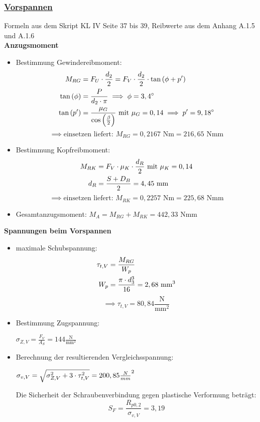 \subsubsection{\underline{Vorspannen}}
Formeln aus dem Skript KL IV  Seite 37 bis 39, Reibwerte aus dem Anhang A.1.5 und A.1.6 \\
\textbf{Anzugsmoment}\\
\begin{itemize}
	\item Bestimmung Gewindereibmoment: 
	\begin{align*}
	M_{RG} &= F_U \cdot \frac{d_2}{2} = F_V\cdot \frac{d_2}{2}\cdot \tan\left(\phi + p'\right)\\
	\tan\left(\phi\right) &= \frac{P}{d_2 \cdot \pi}\implies \phi = 3,4^{\circ}\\
	\tan\left(p'\right) &= \frac{\mu_G}{\cos\left(\frac{\beta}{2}\right)} \text{ mit } \mu_G = 0,14 \implies p' = 9,18^{\circ}
	\end{align*}
	\[\implies \text{einsetzen liefert: }  M_{RG} = 0,2167 \text{ Nm} = 216,65\text{ Nmm}\]
	
	\item Bestimmung Kopfreibmoment:
	\begin{align*}
	M_{RK}&= F_V\cdot \mu_K\cdot \frac{d_R}{2} \text{ mit }\mu_K = 0,14\\
	d_R &= \frac{S+D_B}{2} = 4,45 \text{ mm}
	\end{align*}
	\[\implies \text{einsetzen liefert: }  M_{RK} = 0,2257 \text{ Nm} = 225,68\text{ Nmm} \]
	
	\item Gesamtanzugsmoment:
	$M_A = M_{RG} + M_{RK} = 442,33 \text{ Nmm}$
\end{itemize}
\newpage
\textbf{Spannungen beim Vorspannen}
\begin{itemize}
	\item maximale Schubspannung:
	\begin{align*}
	\tau_{t,V} &= \frac{M_{RG}}{W_p}\\
	W_p &= \frac{\pi\cdot d_3^3}{16} = 2,68 \text{ mm}^3
	\end{align*}
	\[\implies \tau_{t,V} = 80,84 \frac{\text{N}}{\text{mm}^2}\]
	\item Bestimmung Zugspannung: \\
	\begin{center} $\sigma_{Z,V} = \frac{F_V}{A_S} = 144 \frac{\text{N}}{\text{mm}^2}$\end{center}
	\item Berechnung der resultierenden Vergleichsspannung:\\
	\begin{center}
		$\sigma_{v,V} = \sqrt{\sigma_{Z,V}^2+3\cdot\tau_{t,V}^2} = 200,85 \frac{N}{mm}^2$
	\end{center} 
	Die Sicherheit der Schraubenverbindung gegen plastische Verformung beträgt:\\ 
	\[S_F = \frac{R_{p0,2}}{\sigma_{v,V}} = 3,19\]
\end{itemize}
\newpage
